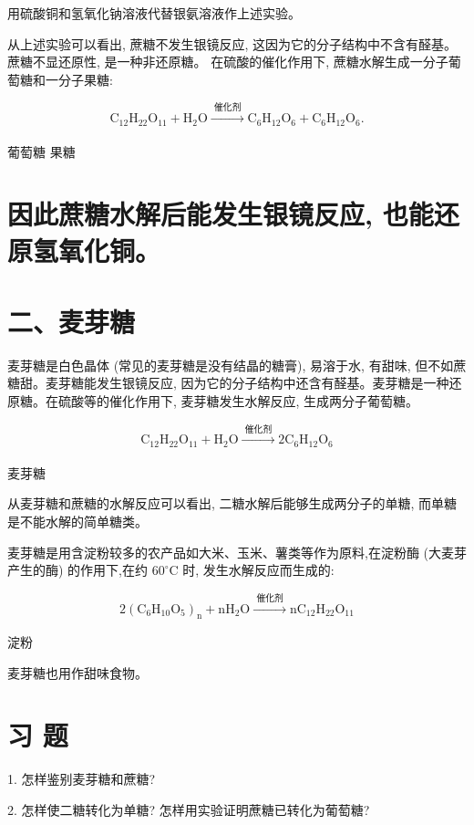 \documentclass[10pt]{article}
\begin{document}
用硫酸铜和氢氧化钠溶液代替银氨溶液作上述实验。

从上述实验可以看出, 蔗糖不发生银镜反应, 这因为它的分子结构中不含有醛基。蔗糖不显还原性, 是一种非还原糖。 在硫酸的催化作用下, 蔗糖水解生成一分子葡萄糖和一分子果糖:

\[
{\mathrm{C}}_{12}{\mathrm{H}}_{22}{\mathrm{O}}_{11} + {\mathrm{H}}_{2}\mathrm{O}\xrightarrow[]{\text{ 催化剂 }}{\mathrm{C}}_{6}{\mathrm{H}}_{12}{\mathrm{O}}_{6} + {\mathrm{C}}_{6}{\mathrm{H}}_{12}{\mathrm{O}}_{6}.
\]

葡萄糖 果糖

\section*{因此蔗糖水解后能发生银镜反应, 也能还原氢氧化铜。}

\section*{二、麦芽糖}

麦芽糖是白色晶体 (常见的麦芽糖是没有结晶的糖膏), 易溶于水, 有甜味, 但不如蔗糖甜。麦芽糖能发生银镜反应, 因为它的分子结构中还含有醛基。麦芽糖是一种还原糖。在硫酸等的催化作用下, 麦芽糖发生水解反应, 生成两分子葡萄糖。

\[
{\mathrm{C}}_{12}{\mathrm{H}}_{22}{\mathrm{O}}_{11} + {\mathrm{H}}_{2}\mathrm{O}\xrightarrow[]{\text{ 催化剂 }}2{\mathrm{C}}_{6}{\mathrm{H}}_{12}{\mathrm{O}}_{6}
\]

麦芽糖

从麦芽糖和蔗糖的水解反应可以看出, 二糖水解后能够生成两分子的单糖, 而单糖是不能水解的简单糖类。

麦芽糖是用含淀粉较多的农产品如大米、玉米、薯类等作为原料,在淀粉酶 (大麦芽产生的酶) 的作用下,在约 \({60}^{ \circ }\mathrm{C}\) 时, 发生水解反应而生成的:

\[
2{\left( {\mathrm{C}}_{6}{\mathrm{H}}_{10}{\mathrm{O}}_{5}\right) }_{\mathrm{n}} + {\mathrm{{nH}}}_{2}\mathrm{O}\xrightarrow[]{\text{ 催化剂 }}{\mathrm{{nC}}}_{12}{\mathrm{H}}_{22}{\mathrm{O}}_{11}
\]

淀粉

麦芽糖也用作甜味食物。

\section*{习 题}

1. 怎样鉴别麦芽糖和蔗糖?

2. 怎样使二糖转化为单糖? 怎样用实验证明蔗糖已转化为葡萄糖?
\end{document}
